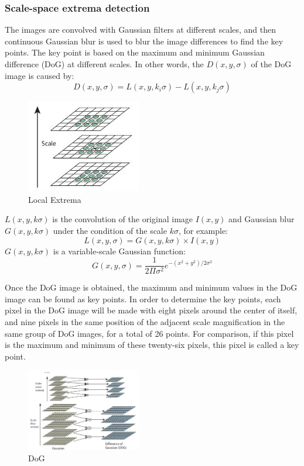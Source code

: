 \documentclass[conference]{IEEEtran}
\begin{document}
\subsubsection{Scale-space extrema detection}The images are convolved with Gaussian filters at different scales, and then continuous Gaussian blur is used to blur the image differences to find the key points. The key point is based on the maximum and minimum Gaussian difference (DoG) at different scales. In other words, the $D(x,y,\sigma)$ of the DoG image is caused by:\begin{equation}
D(x,y,\sigma)=L(x,y,k_i\sigma)-L(x,y,k_j\sigma)
\end{equation}
\begin{center}
	\begin{figure}[htbp]
		\centering
		\includegraphics[width=5cm]{image/sift_local_extrema.jpg}
		\caption{Local Extrema}
	\end{figure}
\end{center}
$L(x,y,k\sigma)$ is the convolution of the original image $I(x,y)$ and Gaussian blur $G(x,y,k\sigma)$ under the condition of the scale $k\sigma$, for example:
\begin{equation}
L(x,y,\sigma)=G(x,y,k\sigma)\times I(x,y)
\end{equation}
$G(x,y,k\sigma)$ is a variable-scale Gaussian function:
\begin{equation}
G(x,y,\sigma) = \frac{1}{2\Pi\sigma^2}e^{-(x^2+y^2)/2\sigma^2}
\end{equation}\par
Once the DoG image is obtained, the maximum and minimum values in the DoG image can be found as key points. In order to determine the key points, each pixel in the DoG image will be made with eight pixels around the center of itself, and nine pixels in the same position of the adjacent scale magnification in the same group of DoG images, for a total of 26 points. For comparison, if this pixel is the maximum and minimum of these twenty-six pixels, this pixel is called a key point.
\begin{center}
	\begin{figure}[htbp]
		\centering
		\includegraphics[width=5cm]{image/sift_dog.jpg}
		\caption{DoG}
	\end{figure}
\end{center}
\end{document}
